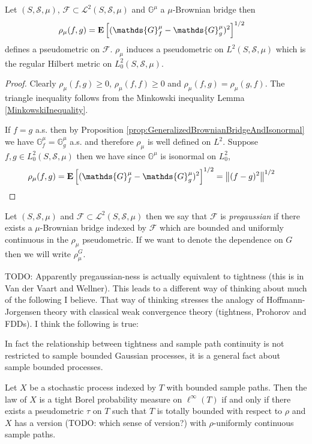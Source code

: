\begin{prop}\label{prop:GeneralizedBrownianBridgePseudometric}Let $(S, \mathcal{S}, \mu)$, $\mathcal{F} \subset \mathcal{L}^2(S, \mathcal{S}, \mu)$ and $\mathds{G}^\mu$ a 
$\mu$-Brownian bridge then 
\begin{align*}
\rho_\mu(f,g) &= \expectation{(\mathds{G}^\mu_f - \mathds{G}^\mu_g)^2}^{1/2}
\end{align*}
defines a pseudometric on $\mathcal{F}$.  $\rho_\mu$ induces a pseudometric on $L^2(S, \mathcal{S}, \mu)$ which is the regular Hilbert metric on $L_0^2(S, \mathcal{S}, \mu)$.
\end{prop}
\begin{proof}
Clearly $\rho_\mu(f,g) \geq 0$,  $\rho_\mu(f,f) \geq 0$ and $\rho_\mu(f,g) = \rho_\mu(g,f)$.  The triangle inequality follows from the Minkowski inequality Lemma \ref{MinkowskiInequality}.

If $f=g$ a.s. then by Proposition \ref{prop:GeneralizedBrownianBridgeAndIsonormal} we have $\mathds{G}^\mu_f = \mathds{G}^\mu_g$ a.s. and therefore $\rho_\mu$ is well defined on $L^2$.  Suppose $f,g \in L^2_0(S,\mathcal{S}, \mu)$ then we have since $\mathds{G}^\mu$ is isonormal on $L^2_0$,
\begin{align*}
\rho_\mu(f,g) &= \expectation{(\mathds{G}^\mu_f - \mathds{G}^\mu_g)^2}^{1/2} = \norm{(f - g)^2}^{1/2}
\end{align*}
\end{proof}

\begin{defn}Let $(S, \mathcal{S}, \mu)$ and $\mathcal{F} \subset \mathcal{L}^2(S, \mathcal{S}, \mu)$ then we say that $\mathcal{F}$ is \emph{pregaussian} if there
exists a $\mu$-Brownian bridge indexed by $\mathcal{F}$ which are bounded and uniformly continuous in the $\rho_\mu$ pseudometric.  If we want to denote the dependence on $G$ then we will write $\rho^G_\mu$.  
\end{defn}

TODO: Apparently pregaussian-ness is actually equivalent to tightness (this is in Van der Vaart and Wellner).  This leads to a different way of thinking about much of the following I believe.  That way of thinking stresses the analogy of Hoffmann-Jorgensen theory with classical weak convergence theory (tightness, Prohorov and FDDs).  I think the following is true:

In fact the relationship between tightness and sample path continuity is not restricted to sample bounded Gaussian processes, it is a general fact about sample bounded processes.
\begin{thm}Let $X$ be a stochastic process indexed by $T$ with bounded sample paths.  Then the law of $X$ is a tight Borel probability measure on $\ell^\infty(T)$ if and only if there exists a pseudometric $\tau$ on $T$ such that $T$ is totally bounded with respect to $\rho$ and $X$ has a version (TODO: which sense of version?) with $\rho$-uniformly continuous sample paths.
\end{thm}

